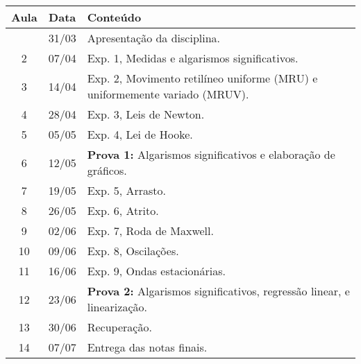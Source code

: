 \begin{center}
\begin{longtable}{ccp{70mm}}
\toprule
Aula & Data & Conteúdo \\
\midrule
\endhead
\bottomrule
\endfoot
  1 & 31/03 & Apresentação da disciplina. \\
  2 & 07/04 & Exp. 1, Medidas e algarismos significativos. \\
  3 & 14/04 & Exp. 2, Movimento retilíneo uniforme (MRU) e uniformemente variado (MRUV). \\
  4 & 28/04 & Exp. 3, Leis de Newton. \\
  5 & 05/05 & Exp. 4, Lei de Hooke. \\
  6 & 12/05 & \textbf{Prova 1:} Algarismos significativos e elaboração de gráficos. \\
  7 & 19/05 & Exp. 5, Arrasto. \\
  8 & 26/05 & Exp. 6, Atrito. \\
  9 & 02/06 & Exp. 7, Roda de Maxwell. \\
 10 & 09/06 & Exp. 8, Oscilações. \\
 11 & 16/06 & Exp. 9, Ondas estacionárias. \\
 12 & 23/06 & \textbf{Prova 2:} Algarismos significativos, regressão linear, e linearização. \\
 13 & 30/06 & Recuperação.\\
 14 & 07/07 & Entrega das notas finais.
\end{longtable}
\end{center}


\cleardoublepage

